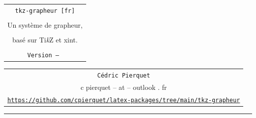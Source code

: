 \documentclass[11pt,a4paper]{ltxdoc}
\providecommand\tikzlogo{Ti\textit{k}Z}
\let\TikZ\tikzlogo
\def\TPversion{\tkzgrapheurversion}
\def\TPdate{\tkzgrapheurdatefrversion}
\begin{document}
\pagestyle{fancy}

\thispagestyle{empty}

\begin{center}
  \begin{minipage}{0.88\linewidth}
  \begin{tcolorbox}[colframe=yellow,colback=yellow!15]
    \begin{center}
      \begin{tabular}{c}
        {\Huge \texttt{tkz-grapheur [fr]}}\\
        \\
        {\LARGE Un système de grapheur,}\\
        \\
        {\LARGE basé sur \textsf{\TikZ} et \textsf{xint}.}\\
        \\
        {\small \texttt{Version \TPversion{} -- \TPdate}}
    \end{tabular}
    \end{center}
  \end{tcolorbox}
\end{minipage}
\end{center}

\begin{center}
  \begin{tabular}{c}
  \texttt{Cédric Pierquet}\\
  {\ttfamily c pierquet -- at -- outlook . fr}\\
  \texttt{\url{https://github.com/cpierquet/latex-packages/tree/main/tkz-grapheur}} \\
\end{tabular}
\end{center}

\hrule

\vfill
\end{document}
